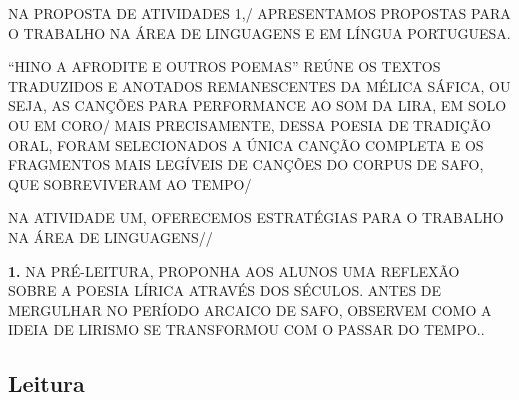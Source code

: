 \documentclass[12pt]{extarticle}
\begin{document}
NA PROPOSTA DE ATIVIDADES 1,/ APRESENTAMOS PROPOSTAS PARA O TRABALHO NA ÁREA DE LINGUAGENS E EM LÍNGUA PORTUGUESA.
 
“HINO A AFRODITE E OUTROS POEMAS” REÚNE OS TEXTOS TRADUZIDOS E ANOTADOS REMANESCENTES DA MÉLICA SÁFICA, OU SEJA, AS CANÇÕES PARA PERFORMANCE AO SOM DA LIRA, EM SOLO OU EM CORO/ MAIS
PRECISAMENTE, DESSA POESIA DE TRADIÇÃO ORAL, FORAM SELECIONADOS A ÚNICA CANÇÃO COMPLETA E OS FRAGMENTOS MAIS LEGÍVEIS DE CANÇÕES DO CORPUS DE SAFO, QUE SOBREVIVERAM AO TEMPO/
 
NA ATIVIDADE UM, OFERECEMOS ESTRATÉGIAS PARA O TRABALHO NA ÁREA DE LINGUAGENS//


\textbf{1.} NA PRÉ-LEITURA, PROPONHA AOS ALUNOS UMA REFLEXÃO SOBRE A
POESIA LÍRICA ATRAVÉS DOS SÉCULOS. ANTES DE MERGULHAR NO PERÍODO ARCAICO
DE SAFO, OBSERVEM COMO A IDEIA DE LIRISMO SE TRANSFORMOU COM O PASSAR DO
TEMPO..


\subsection{Leitura}






\end{document}
